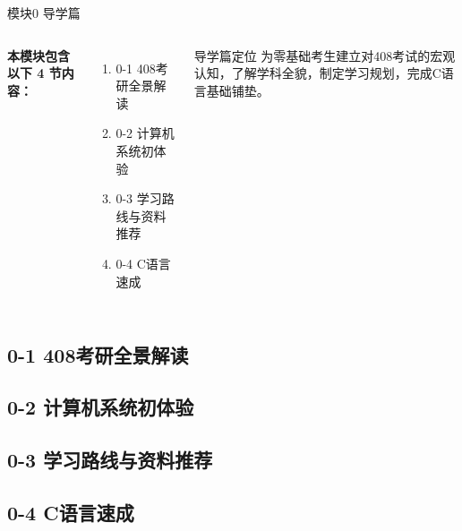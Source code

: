 \begin{frame}[fragile]{模块0 导学篇}
    \begin{columns}[T]
        \textbf{本模块包含以下 4 节内容：}
        \begin{enumerate}
            \item 0-1 408考研全景解读
            \item 0-2 计算机系统初体验
            \item 0-3 学习路线与资料推荐
            \item 0-4 C语言速成
        \end{enumerate}
        \begin{block}{导学篇定位}
            为零基础考生建立对408考试的宏观认知，了解学科全貌，制定学习规划，完成C语言基础铺垫。
        \end{block}
    \end{columns}
\end{frame}

\subsection{0-1 408考研全景解读}


\subsection{0-2 计算机系统初体验}


\subsection{0-3 学习路线与资料推荐}


\subsection{0-4 C语言速成}
